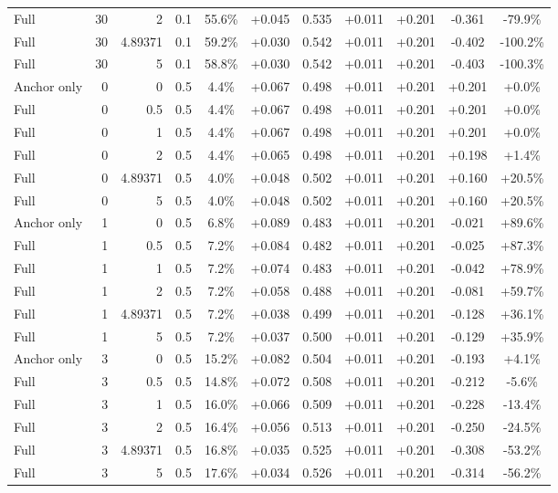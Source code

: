 \begin{table}[htbp]
\begin{tabular}{lrrrccccccc}
Full & 30 & 2 & 0.1 & 55.6\% & +0.045 & 0.535 & +0.011 & +0.201 & -0.361 & -79.9\% \\
Full & 30 & 4.89371 & 0.1 & 59.2\% & +0.030 & 0.542 & +0.011 & +0.201 & -0.402 & -100.2\% \\
Full & 30 & 5 & 0.1 & 58.8\% & +0.030 & 0.542 & +0.011 & +0.201 & -0.403 & -100.3\% \\
Anchor only & 0 & 0 & 0.5 & 4.4\% & +0.067 & 0.498 & +0.011 & +0.201 & +0.201 & +0.0\% \\
Full & 0 & 0.5 & 0.5 & 4.4\% & +0.067 & 0.498 & +0.011 & +0.201 & +0.201 & +0.0\% \\
Full & 0 & 1 & 0.5 & 4.4\% & +0.067 & 0.498 & +0.011 & +0.201 & +0.201 & +0.0\% \\
Full & 0 & 2 & 0.5 & 4.4\% & +0.065 & 0.498 & +0.011 & +0.201 & +0.198 & +1.4\% \\
Full & 0 & 4.89371 & 0.5 & 4.0\% & +0.048 & 0.502 & +0.011 & +0.201 & +0.160 & +20.5\% \\
Full & 0 & 5 & 0.5 & 4.0\% & +0.048 & 0.502 & +0.011 & +0.201 & +0.160 & +20.5\% \\
Anchor only & 1 & 0 & 0.5 & 6.8\% & +0.089 & 0.483 & +0.011 & +0.201 & -0.021 & +89.6\% \\
Full & 1 & 0.5 & 0.5 & 7.2\% & +0.084 & 0.482 & +0.011 & +0.201 & -0.025 & +87.3\% \\
Full & 1 & 1 & 0.5 & 7.2\% & +0.074 & 0.483 & +0.011 & +0.201 & -0.042 & +78.9\% \\
Full & 1 & 2 & 0.5 & 7.2\% & +0.058 & 0.488 & +0.011 & +0.201 & -0.081 & +59.7\% \\
Full & 1 & 4.89371 & 0.5 & 7.2\% & +0.038 & 0.499 & +0.011 & +0.201 & -0.128 & +36.1\% \\
Full & 1 & 5 & 0.5 & 7.2\% & +0.037 & 0.500 & +0.011 & +0.201 & -0.129 & +35.9\% \\
Anchor only & 3 & 0 & 0.5 & 15.2\% & +0.082 & 0.504 & +0.011 & +0.201 & -0.193 & +4.1\% \\
Full & 3 & 0.5 & 0.5 & 14.8\% & +0.072 & 0.508 & +0.011 & +0.201 & -0.212 & -5.6\% \\
Full & 3 & 1 & 0.5 & 16.0\% & +0.066 & 0.509 & +0.011 & +0.201 & -0.228 & -13.4\% \\
Full & 3 & 2 & 0.5 & 16.4\% & +0.056 & 0.513 & +0.011 & +0.201 & -0.250 & -24.5\% \\
Full & 3 & 4.89371 & 0.5 & 16.8\% & +0.035 & 0.525 & +0.011 & +0.201 & -0.308 & -53.2\% \\
Full & 3 & 5 & 0.5 & 17.6\% & +0.034 & 0.526 & +0.011 & +0.201 & -0.314 & -56.2\% \\

\end{tabular}
\end{table}
